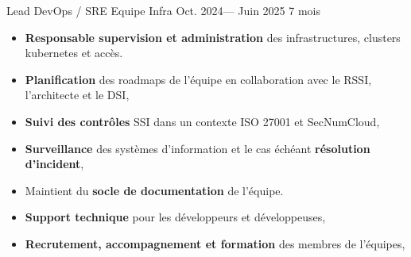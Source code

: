 \jobposition%
{Lead DevOps / SRE}%
{Equipe Infra}%
{Oct. 2024--- Juin 2025}%
{7 mois}%
{
	\begin{itemize}
		\item \textbf{Responsable supervision et administration} des
		      infrastructures, clusters kubernetes et accès.
		\item \textbf{Planification} des roadmaps de l'équipe en collaboration avec
		      le RSSI, l'architecte et le DSI,
		\item \textbf{Suivi des contrôles} SSI dans un contexte ISO 27001 et SecNumCloud,
		\item \textbf{Surveillance} des systèmes d'information et le cas échéant
		      \textbf{résolution d'incident},
		\item Maintient du \textbf{socle de documentation} de l'équipe.
		\item \textbf{Support technique} pour les développeurs et développeuses,
		\item \textbf{Recrutement, accompagnement et formation} des membres de
		      l'équipes,
	\end{itemize}
}
